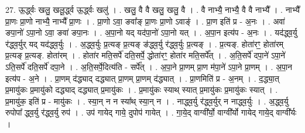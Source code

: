 \documentclass[17pt]{extarticle}
\begin{document}
27. ऊ॒र्द्ध्वः खलु॒ खलू॒र्द्ध्व ऊ॒र्द्ध्वः खलु॑ । . खलु॒ वै वै खलु॒ खलु॒ वै । . वै नाभ्यै॒ नाभ्यै॒ वै वै नाभ्यै᳚ । . नाभ्यै᳚ प्रा॒णः प्रा॒णो नाभ्यै॒ नाभ्यै᳚ प्रा॒णः । . प्रा॒णो ऽवा॒ ङवा᳚ङ् प्रा॒णः प्रा॒णो ऽवाङ्॑ । . प्रा॒ण इति॑ प्र - अ॒नः । . अवा॑ ङपा॒नो॑ ऽपा॒नो ऽवा॒ ङवा॑ ङपा॒नः । . अ॒पा॒नो यद् यद॑पा॒नो॑ ऽपा॒नो यत् । . अ॒पा॒न इत्य॑प - अ॒नः । . यद॑द्ध्व॒र्यु र॑द्ध्व॒र्युर् यद् यद॑द्ध्व॒र्युः । . अ॒द्ध्व॒र्युः प्र॒त्यङ् प्र॒त्यङ् ङ॑द्ध्व॒र्यु र॑द्ध्व॒र्युः प्र॒त्यङ् । . प्र॒त्यङ्. होता॑रꣳ॒॒ होता॑रम् प्र॒त्यङ् प्र॒त्यङ्. होता॑रम् । . होता॑र मति॒सर्पे॑ दति॒सर्पे॒ द्धोता॑रꣳ॒॒ होता॑र मति॒सर्पे᳚त् । . अ॒ति॒सर्पे॑ दपा॒ने॑ ऽपा॒ने॑ ऽति॒सर्पे॑ दति॒सर्पे॑ दपा॒ने । . अ॒ति॒सर्पे॒दित्य॑ति - सर्पे᳚त् । . अ॒पा॒ने प्रा॒णम् प्रा॒ण म॑पा॒ने॑ ऽपा॒ने प्रा॒णम् । . अ॒पा॒न इत्य॑प - अ॒ने । . प्रा॒णम् द॑द्ध्याद् दद्ध्यात् प्रा॒णम् प्रा॒णम् द॑द्ध्यात् । . प्रा॒णमिति॑ प्र - अ॒नम् । . द॒द्ध्या॒त् प्र॒मायु॑कः प्र॒मायु॑को दद्ध्याद् दद्ध्यात् प्र॒मायु॑कः । . प्र॒मायु॑कः स्याथ् स्यात् प्र॒मायु॑कः प्र॒मायु॑कः स्यात् । . प्र॒मायु॑क॒ इति॑ प्र - मायु॑कः । . स्या॒न् न न स्या᳚थ् स्या॒न् न । . नाद्ध्व॒र्यु र॑द्ध्व॒र्युर् न नाद्ध्व॒र्युः । . अ॒द्ध्व॒र्यु रुपोपा᳚ द्ध्व॒र्यु र॑द्ध्व॒र्यु रुप॑ । . उप॑ गायेद् गाये॒ दुपोप॑ गायेत् । . गा॒ये॒द् वाग्वी᳚र्यो॒ वाग्वी᳚र्यो गायेद् गाये॒द् वाग्वी᳚र्यः । \newline
\end{document}
